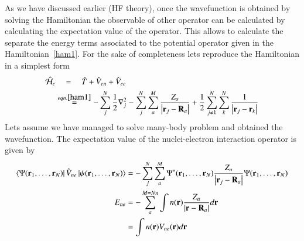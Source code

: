 As we have discussed earlier (HF theory), once the wavefunction is obtained by solving the Hamiltonian the observable of other operator can be calculated by calculating the expectation value of the operator. This allows to calculate the separate the energy terms associated to the potential operator given in the Hamiltonian~\eqref{ham1}. For the sake of completeness lets reproduce the Hamiltonian in a simplest form
\begin{align}
\begin{split}
\hat{\mathcal{H}}_e &\quad = \quad \hat{T} + \hat{V}_{en} + \hat{V}_{ee} \\
     & \stackrel{eqn. \ref{ham1}}= -\sum_j^N \frac{1}{2}\nabla^2_j - \sum_j^N\sum_a^M \frac{Z_a}{\abs{\vb{r}_j - \vb{R}_a}} + \frac{1}{2}\sum^N_{j\neq k}\sum^N_k\frac{1}{\abs{\vb{r}_j - \vb{r}_k}} 
\end{split}
\end{align}
Lets assume we have managed to solve many-body problem and obtained the wavefunction. The expectation value of the nuclei-electron interaction operator is given by
\begin{align}
\begin{split}
\bra{\Psi(\vb{r}_1,\dots,\vb{r}_N)}\hat{V}_{ne}\ket{\psi(\vb{r}_1,\dots,\vb{r}_N)} &= -\sum_j^N\sum_a^M\Psi^{\ast}(\vb{r}_1,\dots,\vb{r}_N)\frac{Z_a}{\abs{\vb{r}_j - \vb{R}_a}}\Psi(\vb{r}_1,\dots,\vb{r}_N)\\
E_{ne} & = -\sum_a^{M=Nn}\int n(\vb{r})\frac{Z_a}{\abs{\vb{r}-\vb{R}_a}} d\vb{r} \\
       & = \int n(\vb{r})V_{ne}(\vb{r})d\vb{r}
\end{split}
\end{align}

